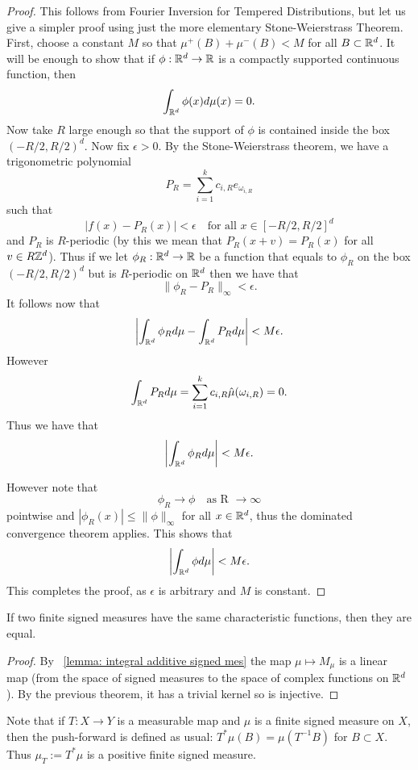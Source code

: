 \documentclass[twoside, a4paper, 10pt]{amsart}
\begin{document}
\begin{proof} This follows from Fourier Inversion for Tempered Distributions, but let us give a simpler proof using just the more elementary Stone-Weierstrass Theorem. First, choose a constant $M$ so that $\mu^+(B) + \mu^-(B) < M$ for all $B \subset \mathbb{R}^d$. It will be enough to show that if $\phi:\mathbb{R}^d \to \mathbb{R}$ is a compactly supported continuous function, then $$\int_{\mathbb{R}^d} \phi(x) d\mu(x) = 0.$$
Now take $R$ large enough so that the support of $\phi$ is contained inside the box $(-R/2,R/2)^d$. Now fix $\epsilon >0$. By the Stone-Weierstrass theorem, we have a trigonometric polynomial $$P_R = \sum_{i=1}^k c_{i,R} e_{\omega_{i,R}}$$ such that $$|f(x) - P_R(x)| < \epsilon \quad\text{for all } x \in [-R/2,R/2]^d$$ and $P_R$ is $R$-periodic (by this we mean that $P_R(x + v) = P_R(x)$ for all $v \in R\mathbb{Z}^d$). Thus if we let $\phi_R:\mathbb{R}^d \to \mathbb{R}$ be a function that equals to $\phi_R$ on the box $(-R/2,R/2)^d$ but is $R$-periodic on $\mathbb{R}^d$ then we have that $$\|\phi_R - P_R \|_{\infty} < \epsilon.$$ It follows now that 
$$\left| \int_{\mathbb{R}^d} \phi_R d\mu - \int_{\mathbb{R}^d} P_R d\mu \right| < M\epsilon.$$
However $$\int_{\mathbb{R}^d} P_R d\mu = \sum_{i=1}^k c_{i,R} \hat{\mu}(\omega_{i,R}) = 0.$$
Thus we have that $$\left| \int_{\mathbb{R}^d} \phi_R d\mu \right| < M\epsilon.$$

However note that $$\phi_R \to \phi \quad \text{as R } \to \infty$$ pointwise and $|\phi_R(x)|\leq \|\phi\|_{\infty}$ for all $x \in \mathbb{R}^d$, thus the dominated convergence theorem applies. This shows that $$\left| \int_{\mathbb{R}^d} \phi d\mu \right| < M\epsilon.$$ This completes the proof, as $\epsilon$ is arbitrary and $M$ is constant. \end{proof}

\begin{corol} If two finite signed measures have the same characteristic functions, then they are equal. \end{corol}

\begin{proof} By ~\ref{lemma: integral additive signed mes} the map $\mu \mapsto M_{\mu}$ is a linear map (from the space of signed measures to the space of complex functions on $\mathbb{R}^d$). By the previous theorem, it has a trivial kernel so is injective. \end{proof}

Note that if $T:X \to Y$ is a measurable map and $\mu$ is a finite signed measure on $X$, then the push-forward is defined as usual: $T^*\mu (B) = \mu(T^{-1}B)$ for $B \subset X$. Thus $\mu_T := T^*\mu$ is a positive finite signed measure. 
\end{document}
